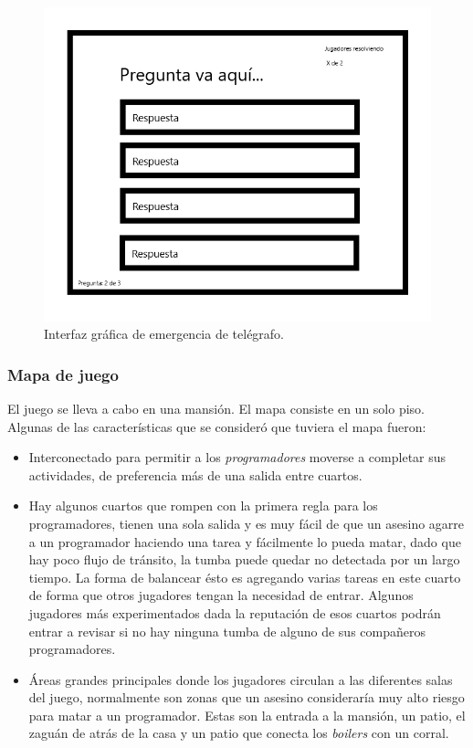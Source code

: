 \begin{itemize}
    \begin{figure}[H]
        \centering
        \includegraphics[width=0.5\linewidth]{images/sabotage_preguntas.png}
        \caption{Interfaz gráfica de emergencia de telégrafo.}
        \label{fig:ui_teletransporte}
    \end{figure}
\end{itemize}

\subsubsection{Mapa de juego}
El juego se lleva a cabo en una mansión. El mapa consiste en un solo piso. Algunas de las características que se consideró que tuviera el mapa fueron:
\begin{itemize}
    \item Interconectado para permitir a los \textit{programadores} moverse a completar sus actividades, de preferencia más de una salida entre cuartos. 
    \item Hay algunos cuartos que rompen con la primera regla para los programadores, tienen una sola salida y es muy fácil de que un asesino agarre a un programador haciendo una tarea y fácilmente lo pueda matar, dado que hay poco flujo de tránsito, la tumba puede quedar no detectada por un largo tiempo. La forma de balancear ésto es agregando varias tareas en este cuarto de forma que otros jugadores tengan la necesidad de entrar. Algunos jugadores más experimentados dada la reputación de esos cuartos podrán entrar a revisar si no hay ninguna tumba de alguno de sus compañeros programadores.
    \item Áreas grandes principales donde los jugadores circulan a las diferentes salas del juego, normalmente son zonas que un asesino consideraría muy alto riesgo para matar a un programador. Estas son la entrada a la mansión, un patio, el zaguán de atrás de la casa y un patio que conecta los \textit{boilers} con un corral.
\end{itemize}

